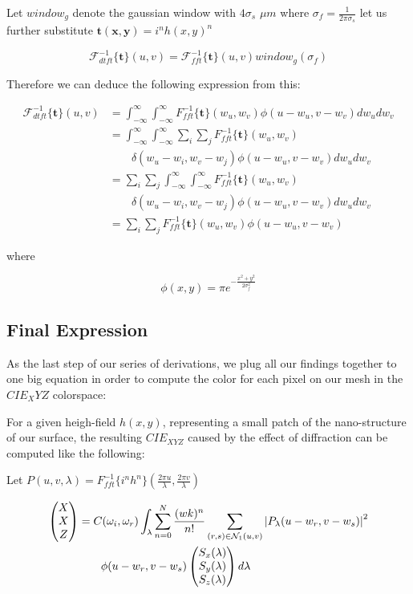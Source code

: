 Let $window_g$ denote the gaussian window with $4\sigma_s$ $\mu m$ where $\sigma_f = \frac{1}{2\pi\sigma_s}$
let us further substitute $\mathbf{t(x,y)}=i^n h(x,y)^n$

\begin{equation}
\mathcal{F}_{dtft}^{-1}\{\mathbf{t}\}(u,v) = \mathcal{F}_{fft}^{-1}\{\mathbf{t}\}(u,v)window_g(\sigma_f)
\end{equation} 

Therefore we can deduce the following expression from this:

\begin{align*}
\mathcal{F}_{dtft}^{-1}\{\mathbf{t}\}(u,v)
& = \int_{-\infty}^{\infty} \int_{-\infty}^{\infty} {F}_{fft}^{-1}\{\mathbf{t}\}(w_u,w_v) \phi(u-w_u, v-w_v) dw_u dw_v \\
& = \int_{-\infty}^{\infty} \int_{-\infty}^{\infty} \sum_i \sum_j {F}_{fft}^{-1}\{\mathbf{t}\}(w_u,w_v) \\ 
& \quad \quad \delta(w_u-w_i, w_v-w_j)\phi(u-w_u, v-w_v) dw_u dw_v \\
& = \sum_i \sum_j \int_{-\infty}^{\infty} \int_{-\infty}^{\infty}  {F}_{fft}^{-1}\{\mathbf{t}\}(w_u,w_v) \\
& \quad \quad \delta(w_u-w_i, w_v-w_j)\phi(u-w_u, v-w_v) dw_u dw_v \\
& = \sum_i \sum_j {F}_{fft}^{-1}\{\mathbf{t}\}(w_u,w_v) \phi(u-w_u, v-w_v)
\end{align*}

where 

\begin{equation} \label{eq:gaussweight}
 \phi(x,y) = \pi e^{-\frac{x^2 + y^2}{2\sigma_{f}^2}}
\end{equation} 

\subsection{Final Expression}
As the last step of our series of derivations, we plug all our findings together to one big equation in order to compute the color for each pixel on our mesh in the $CIE_XYZ$ colorspace:

For a given heigh-field $h(x,y)$, representing a small patch of the nano-structure of our surface, the resulting $CIE_{XYZ}$ caused by the effect of diffraction can be computed like the following: 

Let $P(u,v,\lambda) = {F}_{fft}^{-1}\{i^n h^n\}(\frac{2\pi u}{\lambda},\frac{2\pi v}{\lambda})$

\begin{equation}
\begin{split}
\colvec[X]{X}{Z}& = C(\omega_i,\omega_r) \int_{\lambda} \sum_{n=0}^N  \frac{(wk)^n}{n!} \sum_{(r,s) \in \mathcal{N}_1(u,v)} \left| P_{\lambda}(u-w_r,v-w_s) \right|^2 \\
& \quad \quad  \phi(u-w_r, v-w_s) \colvec[S_x(\lambda)]{S_y(\lambda)}{S_z(\lambda)}d\lambda
\end{split}
\end{equation}

